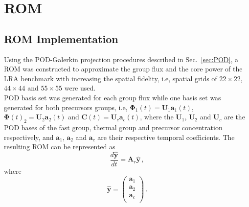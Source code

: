 \documentclass[]{interact}
\theoremstyle{plain}%
\theoremstyle{definition}
\theoremstyle{remark}
\begin{document}

\section{ROM }
\subsection{ROM Implementation}

Using the POD-Galerkin projection procedures described in Sec.~\ref{sec:POD}, a ROM was constructed to approximate the group flux and the core power of the LRA benchmark with increasing the spatial fidelity, i.e, spatial grids of $22\times 22$, $44\times44$ and $55 \times 55$ were used.\\
POD basis set was generated for each group flux while one basis set was generated for both precursors groups, i.e, 
$\mathbf{\Phi}_1(t) = \mathbf{U}_1\mathbf{a}_1(t)$, $\mathbf{\Phi}(t)_2 = \mathbf{U}_2\mathbf{a}_2(t)$ and $\mathbf{C}(t) = \mathbf{U}_c\mathbf{a}_c(t)$, where the $\mathbf{U}_1$, $\mathbf{U}_2$  and $\mathbf{U}_c$ are the POD bases of the fast group, thermal group and precursor concentration respectively, and $\mathbf{a}_1$, $\mathbf{a}_2$ and $\mathbf{a}_c$ are their respective temporal coefficients. 
The resulting ROM can be represented as 
\begin{equation}
	\frac{d\mathbf{\hat{y}}}{dt} = \mathbf{A}_r\mathbf{\hat{y}}\, , 
	\label{eq:ROM}
\end{equation}
where
 \begin{equation*}
	\mathbf{\hat{y}} = \begin{pmatrix}
	\mathbf{a}_1\\
	\mathbf{a}_2 \\
	\mathbf{a}_c \\
	\end{pmatrix} \,.
 \end{equation*}
\end{document}
